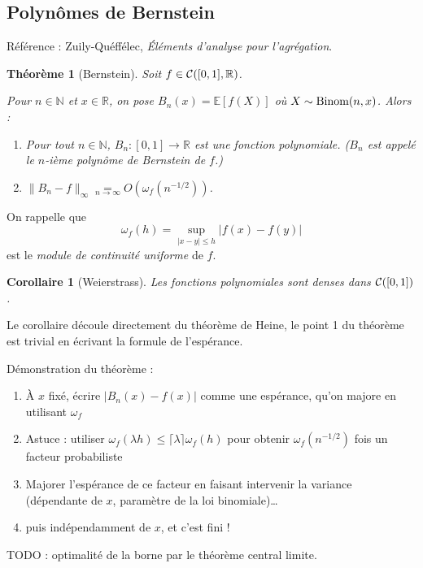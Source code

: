 \documentclass[a4paper, 11pt]{article}
\def\N{\mathbb{N}}
\def\R{\mathbb{R}}
\def\Cf{{\cal{C}}}
\def\E{\mathbb{E}}
\newtheorem*{theorem}{Théorème}
\newtheorem*{corollary}{Corollaire}
\begin{document}
\newpage


\subsection{Polynômes de Bernstein}

Référence : Zuily-Quéffélec, \emph{Éléments d'analyse pour l'agrégation}.

\begin{theorem}[Bernstein]
  Soit $f \in \Cf([0,1], \R)$.
  
  Pour $n \in \N$ et $x \in \R$, on pose $B_n(x) = \E[f(X)]$ où $X \sim
  \textnormal{Binom}(n,x)$. Alors :
  \begin{enumerate}
  \item Pour tout $n \in \N$, $B_n : [0,1] \to \R$ est une fonction polynomiale.
    ($B_n$ est appelé le $n$-ième polynôme de Bernstein de $f$.)
  \item $\|B_n - f\|_\infty \underset{n \to \infty}{=} O\left(
      \omega_f(n^{-1/2}) \right)$.
  \end{enumerate}
\end{theorem}

On rappelle que
\[ \omega_f(h) = \sup_{|x-y| \leq h} |f(x) - f(y)| \]
est le \emph{module de continuité uniforme} de $f$.

\begin{corollary}[Weierstrass]
  Les fonctions polynomiales sont denses dans $\Cf([0,1])$.
\end{corollary}

Le corollaire découle directement du théorème de Heine, le point 1 du théorème
est trivial en écrivant la formule de l'espérance.

Démonstration du théorème :
\begin{enumerate}
\item À $x$ fixé, écrire $|B_n(x) - f(x)|$ comme une espérance, qu'on majore en
  utilisant $\omega_f$
\item Astuce : utiliser $\omega_f(\lambda h) \leq \lceil \lambda \rceil
  \omega_f(h)$ pour obtenir $\omega_f(n^{-1/2})$ fois un facteur probabiliste
\item Majorer l'espérance de ce facteur en faisant intervenir la variance
  (dépendante de $x$, paramètre de la loi binomiale)…
\item puis indépendamment de $x$, et c'est fini !
\end{enumerate}

TODO : optimalité de la borne par le théorème central limite.
\end{document}
